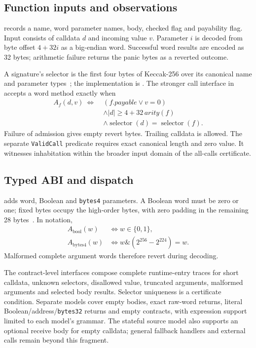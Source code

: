 \documentclass[conference]{IEEEtran}
\newcommand{\code}[1]{\texttt{#1}}
\begin{document}
\subsection{Function inputs and observations}
 records a name, word parameter names, body,
checked flag and payability flag. Input consists of calldata $d$ and incoming
value $v$. Parameter $i$ is decoded from byte offset $4+32i$ as a big-endian
word. Successful word results are encoded as 32 bytes; arithmetic failure
returns the panic bytes as a reverted outcome.

A signature's selector is the first four bytes of Keccak-256 over its canonical
name and parameter types~\cite{abi}; the implementation is
. The stronger call interface in
 accepts a word method exactly when
\begin{align*}
 A_f(d,v)\ \Longleftrightarrow\;&(f.\mathit{payable}\lor v=0)\\
 &\land |d|\geq 4+32\,\mathit{arity}(f)\\
 &\land \operatorname{selector}(d)=\operatorname{selector}(f).
\end{align*}
Failure of admission gives empty revert bytes. Trailing calldata is allowed.
The separate \code{ValidCall} predicate requires exact canonical length and
zero value. It witnesses inhabitation within the broader input domain of the
all-calls certificate.

\subsection{Typed ABI and dispatch}
 adds word, Boolean and \code{bytes4} parameters.
A Boolean word must be zero or one; fixed bytes occupy the high-order bytes,
with zero padding in the remaining 28 bytes~\cite{abi}. In notation,
\begin{align*}
 A_{\mathrm{bool}}(w)&\iff w\in\{0,1\},\\
 A_{\mathrm{bytes4}}(w)&\iff w\mathbin{\&}(2^{256}-2^{224})=w.
\end{align*}
Malformed complete argument words therefore revert during decoding.

The contract-level interfaces compose complete runtime-entry traces for
short calldata, unknown selectors, disallowed value, truncated arguments,
malformed arguments and selected body results. Selector uniqueness is a
certificate condition. Separate models cover empty bodies, exact raw-word
returns, literal Boolean/address/\code{bytes32} returns and empty contracts,
with expression support limited to each model's grammar. The stateful source
model also supports an optional receive body for empty calldata; general
fallback handlers and external calls remain beyond this fragment.
\end{document}
